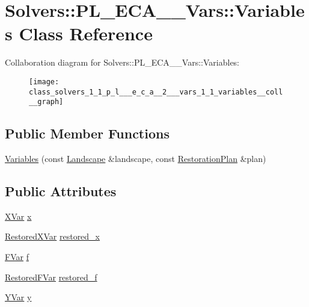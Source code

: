 \hypertarget{class_solvers_1_1_p_l___e_c_a__2___vars_1_1_variables}{}\section{Solvers\+:\+:P\+L\+\_\+\+E\+C\+A\+\_\+\_\+\+Vars\+:\+:Variables Class Reference}
\label{class_solvers_1_1_p_l___e_c_a__2___vars_1_1_variables}


Collaboration diagram for Solvers\+:\+:P\+L\+\_\+\+E\+C\+A\+\_\+\_\+\+Vars\+:\+:Variables\+:\nopagebreak
\begin{figure}[H]
\begin{center}
\leavevmode
\texttt{[image: class\_solvers\_1\_1\_p\_l\_\_\_e\_c\_a\_\_2\_\_\_vars\_1\_1\_variables\_\_coll\_\_graph]}
\end{center}
\end{figure}
\subsection*{Public Member Functions}
\begin{DoxyCompactItemize}
\item 
\hyperlink{class_solvers_1_1_p_l___e_c_a__2___vars_1_1_variables_a6fcd6a21fdc8beaaaefbf8be71dd75d4}{Variables} (const \hyperlink{class_landscape}{Landscape} \&landscape, const \hyperlink{class_restoration_plan}{Restoration\+Plan} \&plan)
\end{DoxyCompactItemize}
\subsection*{Public Attributes}
\begin{DoxyCompactItemize}
\item 
\hyperlink{class_solvers_1_1_p_l___e_c_a__2___vars_1_1_x_var}{X\+Var} \hyperlink{class_solvers_1_1_p_l___e_c_a__2___vars_1_1_variables_af0800b7de549be7b4193c1b0212a25f0}{x}
\item 
\hyperlink{class_solvers_1_1_p_l___e_c_a__2___vars_1_1_restored_x_var}{Restored\+X\+Var} \hyperlink{class_solvers_1_1_p_l___e_c_a__2___vars_1_1_variables_aafc9c2e8e70dd0348e912f32531071a9}{restored\+\_\+x}
\item 
\hyperlink{class_solvers_1_1_p_l___e_c_a__2___vars_1_1_f_var}{F\+Var} \hyperlink{class_solvers_1_1_p_l___e_c_a__2___vars_1_1_variables_a94540f3c449080f32121c6bc4c78892e}{f}
\item 
\hyperlink{class_solvers_1_1_p_l___e_c_a__2___vars_1_1_restored_f_var}{Restored\+F\+Var} \hyperlink{class_solvers_1_1_p_l___e_c_a__2___vars_1_1_variables_aa1cd0e61a21a6b1aacf3c69384b360ed}{restored\+\_\+f}
\item 
\hyperlink{class_solvers_1_1_p_l___e_c_a__2___vars_1_1_y_var}{Y\+Var} \hyperlink{class_solvers_1_1_p_l___e_c_a__2___vars_1_1_variables_ad91fe57de19d83708726d75373edc22a}{y}
\end{DoxyCompactItemize}


